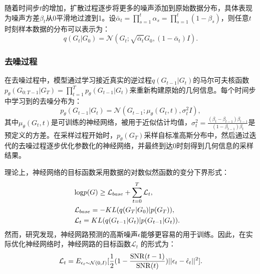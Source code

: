 随着时间步$t$的增加，扩散过程逐步将更多的噪声添加到原始数据分布，具体表现为噪声方差$\beta_t$从0平滑地过渡到1。设$\bar{\alpha}_t = \prod^t_{s=1} \alpha_s = \prod^t_{s=1}(1-\beta_s)$，则任意$t$时刻样本数据的分布可以表示为：
\begin{equation}
    q(G_t|G_0) = \mathcal{N}(G_t; \sqrt{\bar{\alpha}_t} G_0, (1 - \bar{\alpha}_t) I).
\end{equation} 

\subsubsection{去噪过程}
在去噪过程中，模型通过学习接近真实的逆过程$q(G_{t-1} | G_t)$的马尔可夫核函数$p_\theta(G_{0:T-1}| G_{T}) = \prod^T_{t=1} p_\theta(G_{t-1} | G_t)$来重新构建原始的几何信息。每个时间步中学习到的去噪分布为： 
\begin{equation}
  p_\theta(G_{t-1} | G_t) = \mathcal{N}(G_{t-1}; \mu_\theta(G_t, t), \sigma_t^2 I),
\end{equation}
其中$\mu_\theta(G_t, t)$是可训练的神经网络，被用于近似估计均值，$\sigma^2_t = \frac{(\beta_t - \beta_{t-1})\beta_{t-1}}{(1 - \beta_{t-1}) \beta_t}$是预定义的方差。在采样过程开始时，$p_\theta(G_T)$采样自标准高斯分布中，然后通过迭代的去噪过程逐步优化参数化的神经网络，并最终到达0时刻得到几何信息的采样结果。

理论上，神经网络的目标函数采用数据的对数似然函数的变分下界形式：
\begin{eqnarray}
    &{\rm log}p(G) \geq \mathcal{L}_{base} + \sum_{t=0}^T \mathcal{L}_t,& \\
    &\mathcal{L}_{base} = -KL(q(G_T|G_0)|p(G_T)),& \\
    &\mathcal{L}_t = KL(q(G_{t-1}|G_t)|p(G_{t-1}|G_t)). &
\end{eqnarray}
然而，研究发现，神经网路预测的高斯噪声$\epsilon$能够更容易的用于训练。因此，在实际优化神经网络时，神经网路的目标函数$\mathcal{L}_t$ \cite{vaediff_kingma_21}的形式为：
\begin{equation}
    \mathcal{L}_t = E_{\epsilon_t \sim \mathcal{N}(0, I)}[\frac{1}{2}(1- \frac{{\rm SNR}(t-1)}{{\rm SNR}(t)})||\epsilon_t - \hat{\epsilon}_t||^2].
\end{equation}

